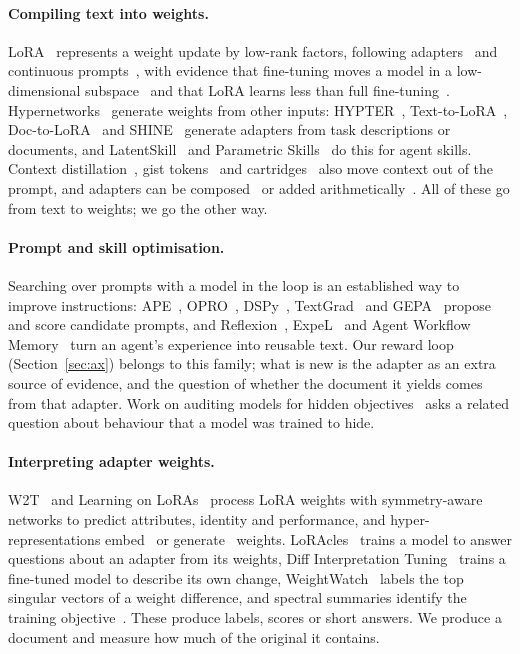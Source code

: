 \documentclass[11pt]{article}
\begin{document}
\paragraph{Compiling text into weights.} LoRA~\cite{lora} represents a weight update by low-rank factors, following adapters~\cite{houlsby}
and continuous prompts~\cite{prefix}, with evidence that fine-tuning moves a model in a low-dimensional subspace~\cite{intrinsic} and that LoRA
learns less than full fine-tuning~\cite{lorabiderman}. Hypernetworks~\cite{hypernet} generate weights from other inputs: HYPTER~\cite{hypter},
Text-to-LoRA~\cite{t2l}, Doc-to-LoRA~\cite{d2l} and SHINE~\cite{shine} generate adapters from task descriptions or documents, and
LatentSkill~\cite{latentskill} and Parametric Skills~\cite{paramskills} do this for agent skills. Context distillation~\cite{askell,snell},
gist tokens~\cite{gist} and cartridges~\cite{cartridges} also move context out of the prompt, and adapters can be composed~\cite{lorahub} or
added arithmetically~\cite{taskarith}. All of these go from text to weights; we go the other way.

\paragraph{Prompt and skill optimisation.} Searching over prompts with a model in the loop is an established way to improve instructions:
APE~\cite{ape}, OPRO~\cite{opro}, DSPy~\cite{dspy}, TextGrad~\cite{textgrad} and GEPA~\cite{gepa} propose and score candidate prompts, and
Reflexion~\cite{reflexion}, ExpeL~\cite{expel} and Agent Workflow Memory~\cite{awm} turn an agent's experience into reusable text. Our reward
loop (Section~\ref{sec:ax}) belongs to this family; what is new is the adapter as an extra source of evidence, and the question of whether the
document it yields comes from that adapter. Work on auditing models for hidden objectives~\cite{auditing} asks a related question about behaviour
that a model was trained to hide.

\paragraph{Interpreting adapter weights.} W2T~\cite{w2t} and Learning on LoRAs~\cite{lol} process LoRA weights with symmetry-aware networks to
predict attributes, identity and performance, and hyper-representations embed~\cite{hyperrep} or generate~\cite{nndiff} weights. LoRAcles~\cite{loracles}
trains a model to answer questions about an adapter from its weights, Diff Interpretation Tuning~\cite{dit} trains a fine-tuned model to describe its
own change, WeightWatch~\cite{weightwatch} labels the top singular vectors of a weight difference, and spectral summaries identify the training
objective~\cite{spectral}. These produce labels, scores or short answers. We produce a document and measure how much of the original it contains.
\end{document}
